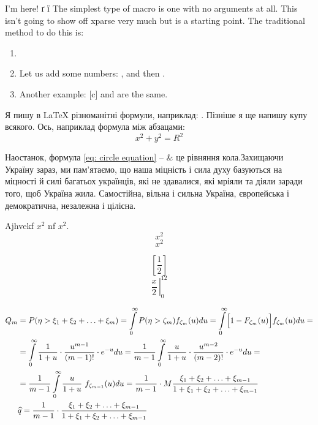 \documentclass[14pt]{extarticle}
\begin{document}
I'm here! ґ ї The simplest type of macro is one with no arguments at all. This isn’t going to show off xparse very much but is a starting point. The traditional method to do this is: 

\begin{enumerate}[label=($\bigstar$)]
    \item \NoArguments
    \item Let us add some numbers: , and then .
    \item Another example: [c] and  are the same.
\end{enumerate}

Я пишу в \LaTeX{} різноманітні формули, наприклад: . Пізніше я ще напишу купу всякого. Ось, наприклад формула між абзацами:
\begin{equation}\label{eq: circle equation}
    x^2 + y^2 = R^2
\end{equation}

Наостанок, формула \eqref{eq: circle equation} -- \& це рівняння кола.Захищаючи Україну зараз, ми па\-м'ятаємо, що наша міцність і сила духу базуються на міцності й силі багатьох українців, які не здавалися, які мріяли та діяли заради того, щоб Україна жила. Самостійна, вільна і сильна Україна, європейська і демократична, незалежна і цілісна.

Ajhvekf $ x^2$ nf \(x^2\). 
$$ x^2 $$ \[ x^2 \] 


$$ [ \frac{1}{2} ] $$
$$ \left. \frac{x}{2}\, \right|_{0}^{12} $$

\[
    \begin{aligned}
        Q_m &
            = P(\eta > \xi_1 + \xi_2 + \ldots + \xi_m) = \int\limits_0^\infty P(\eta > \zeta_m)f_{\zeta_m}(u)du = 
            \int\limits_0^\infty \Bigl[ 1-F_{\zeta_m}(u) \Bigr]f_{\zeta_m}(u)du = \\
        & = \int\limits_0^\infty \frac{1}{1+u} \cdot \frac{u^{m-1}}{(m-1)!} \cdot e^{-u} du 
          = \frac{1}{m-1} \int\limits_0^\infty \frac{u}{1+u} \cdot \frac{u^{m-2}}{(m-2)!} \cdot e^{-u} du = \\
        & = \frac{1}{m-1} \int\limits_0^\infty \frac{u}{1+u}\ f_{\zeta_{m-1}}(u) du
          = \frac{1}{m-1} \cdot M\frac{\xi_1 + \xi_2 + \ldots + \xi_{m-1}}{1+\xi_1 + \xi_2 + \ldots + \xi_{m-1}} \\
        & \widehat{q} = \frac{1}{m-1} \cdot \frac{\xi_1 + \xi_2 + \ldots + \xi_{m-1}}{1+\xi_1 + \xi_2 + \ldots + \xi_{m-1}} \\
    \end{aligned}
\]
\end{document}
